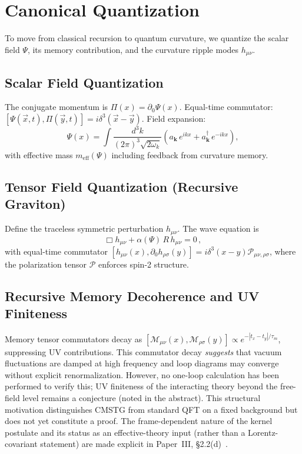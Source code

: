 \documentclass[12pt,a4paper]{article}
\begin{document}
\section{Canonical Quantization}
\label{sec:quantization}

To move from classical recursion to quantum curvature, we quantize the scalar
field $\Psi$, its memory contribution, and the curvature ripple modes $h_{\mu\nu}$.

\subsection{Scalar Field Quantization}

The conjugate momentum is $\Pi(x) = \partial_0\Psi(x)$.
Equal-time commutator: $[\Psi(\vec{x},t), \Pi(\vec{y},t)] = i\delta^3(\vec{x}-\vec{y})$.
Field expansion:
\begin{equation}
\Psi(x) = \int \frac{d^3k}{(2\pi)^3\sqrt{2\omega_k}}
\left(a_{\mathbf{k}}\,e^{ikx} + a^\dagger_{\mathbf{k}}\,e^{-ikx}\right),
\end{equation}
with effective mass $m_{\mathrm{eff}}(\Psi)$ including feedback from curvature memory.

\subsection{Tensor Field Quantization (Recursive Graviton)}

Define the traceless symmetric perturbation $h_{\mu\nu}$. The wave equation is
\begin{equation}
\Box h_{\mu\nu} + \alpha(\Psi)\,R\,h_{\mu\nu} = 0\,,
\end{equation}
with equal-time commutator
$[h_{\mu\nu}(x), \partial_0 h_{\rho\sigma}(y)] = i\delta^3(x-y)\mathcal{P}_{\mu\nu,\rho\sigma}$,
where the polarization tensor $\mathcal{P}$ enforces spin-2 structure.

\subsection{Recursive Memory Decoherence and UV Finiteness}

Memory tensor commutators decay as
$[\mathcal{M}_{\mu\nu}(x),\mathcal{M}_{\rho\sigma}(y)] \propto e^{-|t_x-t_y|/\tau_m}$,
suppressing UV contributions. This commutator decay \emph{suggests} that vacuum
fluctuations are damped at high frequency and loop diagrams may converge without
explicit renormalization. However, no one-loop calculation has been performed to
verify this; UV finiteness of the interacting theory beyond the free-field level
remains a conjecture (noted in the abstract). This structural motivation
distinguishes CMSTG from standard QFT on a fixed background but does not
yet constitute a proof. The frame-dependent nature of the kernel postulate
and its status as an effective-theory input (rather than a Lorentz-covariant
statement) are made explicit in Paper~III, \S2.2(d)~\cite{WilsonPaperIII}.
\end{document}
